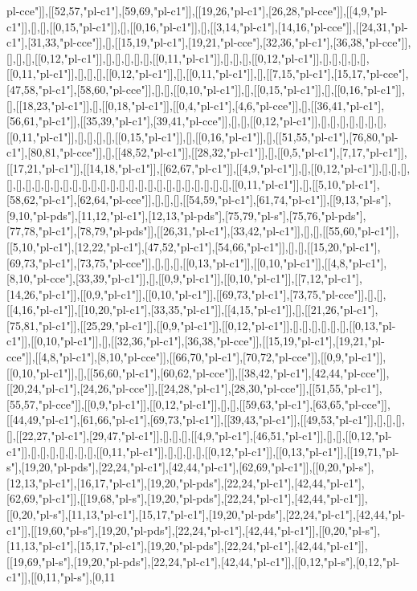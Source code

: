 pl-cce"]],[[52,57,"pl-c1"],[59,69,"pl-c1"]],[[19,26,"pl-c1"],[26,28,"pl-cce"]],[[4,9,"pl-c1"]],[],[],[[0,15,"pl-c1"]],[],[[0,16,"pl-c1"]],[],[[3,14,"pl-c1"],[14,16,"pl-cce"]],[[24,31,"pl-c1"],[31,33,"pl-cce"]],[],[[15,19,"pl-c1"],[19,21,"pl-cce"],[32,36,"pl-c1"],[36,38,"pl-cce"]],[],[],[],[[0,12,"pl-c1"]],[],[],[],[],[],[[0,11,"pl-c1"]],[],[],[],[[0,12,"pl-c1"]],[],[],[],[],[],[[0,11,"pl-c1"]],[],[],[],[[0,12,"pl-c1"]],[],[[0,11,"pl-c1"]],[],[[7,15,"pl-c1"],[15,17,"pl-cce"],[47,58,"pl-c1"],[58,60,"pl-cce"]],[],[],[[0,10,"pl-c1"]],[],[[0,15,"pl-c1"]],[],[[0,16,"pl-c1"]],[],[[18,23,"pl-c1"]],[],[[0,18,"pl-c1"]],[[0,4,"pl-c1"],[4,6,"pl-cce"]],[],[[36,41,"pl-c1"],[56,61,"pl-c1"]],[[35,39,"pl-c1"],[39,41,"pl-cce"]],[],[],[[0,12,"pl-c1"]],[],[],[],[],[],[],[],[[0,11,"pl-c1"]],[],[],[],[],[[0,15,"pl-c1"]],[],[[0,16,"pl-c1"]],[],[[51,55,"pl-c1"],[76,80,"pl-c1"],[80,81,"pl-cce"]],[],[[48,52,"pl-c1"]],[[28,32,"pl-c1"]],[],[[0,5,"pl-c1"],[7,17,"pl-c1"]],[[17,21,"pl-c1"]],[[14,18,"pl-c1"]],[[62,67,"pl-c1"]],[[4,9,"pl-c1"]],[],[[0,12,"pl-c1"]],[],[],[],[],[],[],[],[],[],[],[],[],[],[],[],[],[],[],[],[],[],[],[],[],[],[],[],[[0,11,"pl-c1"]],[],[[5,10,"pl-c1"],[58,62,"pl-c1"],[62,64,"pl-cce"]],[],[],[],[[54,59,"pl-c1"],[61,74,"pl-c1"]],[[9,13,"pl-s"],[9,10,"pl-pds"],[11,12,"pl-c1"],[12,13,"pl-pds"],[75,79,"pl-s"],[75,76,"pl-pds"],[77,78,"pl-c1"],[78,79,"pl-pds"]],[[26,31,"pl-c1"],[33,42,"pl-c1"]],[],[],[[55,60,"pl-c1"]],[[5,10,"pl-c1"],[12,22,"pl-c1"],[47,52,"pl-c1"],[54,66,"pl-c1"]],[],[],[[15,20,"pl-c1"],[69,73,"pl-c1"],[73,75,"pl-cce"]],[],[],[],[[0,13,"pl-c1"]],[[0,10,"pl-c1"]],[[4,8,"pl-c1"],[8,10,"pl-cce"],[33,39,"pl-c1"]],[],[[0,9,"pl-c1"]],[[0,10,"pl-c1"]],[[7,12,"pl-c1"],[14,26,"pl-c1"]],[[0,9,"pl-c1"]],[[0,10,"pl-c1"]],[[69,73,"pl-c1"],[73,75,"pl-cce"]],[],[],[[4,16,"pl-c1"]],[[10,20,"pl-c1"],[33,35,"pl-c1"]],[[4,15,"pl-c1"]],[],[[21,26,"pl-c1"],[75,81,"pl-c1"]],[[25,29,"pl-c1"]],[[0,9,"pl-c1"]],[[0,12,"pl-c1"]],[],[],[],[],[],[],[[0,13,"pl-c1"]],[[0,10,"pl-c1"]],[],[[32,36,"pl-c1"],[36,38,"pl-cce"]],[[15,19,"pl-c1"],[19,21,"pl-cce"]],[[4,8,"pl-c1"],[8,10,"pl-cce"]],[[66,70,"pl-c1"],[70,72,"pl-cce"]],[[0,9,"pl-c1"]],[[0,10,"pl-c1"]],[],[[56,60,"pl-c1"],[60,62,"pl-cce"]],[[38,42,"pl-c1"],[42,44,"pl-cce"]],[[20,24,"pl-c1"],[24,26,"pl-cce"]],[[24,28,"pl-c1"],[28,30,"pl-cce"]],[[51,55,"pl-c1"],[55,57,"pl-cce"]],[[0,9,"pl-c1"]],[[0,12,"pl-c1"]],[],[],[[59,63,"pl-c1"],[63,65,"pl-cce"]],[[44,49,"pl-c1"],[61,66,"pl-c1"],[69,73,"pl-c1"]],[[39,43,"pl-c1"]],[[49,53,"pl-c1"]],[],[],[],[],[[22,27,"pl-c1"],[29,47,"pl-c1"]],[],[],[],[[4,9,"pl-c1"],[46,51,"pl-c1"]],[],[],[[0,12,"pl-c1"]],[],[],[],[],[],[],[],[[0,11,"pl-c1"]],[],[],[],[],[[0,12,"pl-c1"]],[[0,13,"pl-c1"]],[[19,71,"pl-s"],[19,20,"pl-pds"],[22,24,"pl-c1"],[42,44,"pl-c1"],[62,69,"pl-c1"]],[[0,20,"pl-s"],[12,13,"pl-c1"],[16,17,"pl-c1"],[19,20,"pl-pds"],[22,24,"pl-c1"],[42,44,"pl-c1"],[62,69,"pl-c1"]],[[19,68,"pl-s"],[19,20,"pl-pds"],[22,24,"pl-c1"],[42,44,"pl-c1"]],[[0,20,"pl-s"],[11,13,"pl-c1"],[15,17,"pl-c1"],[19,20,"pl-pds"],[22,24,"pl-c1"],[42,44,"pl-c1"]],[[19,60,"pl-s"],[19,20,"pl-pds"],[22,24,"pl-c1"],[42,44,"pl-c1"]],[[0,20,"pl-s"],[11,13,"pl-c1"],[15,17,"pl-c1"],[19,20,"pl-pds"],[22,24,"pl-c1"],[42,44,"pl-c1"]],[[19,69,"pl-s"],[19,20,"pl-pds"],[22,24,"pl-c1"],[42,44,"pl-c1"]],[[0,12,"pl-s"],[0,12,"pl-c1"]],[[0,11,"pl-s"],[0,11